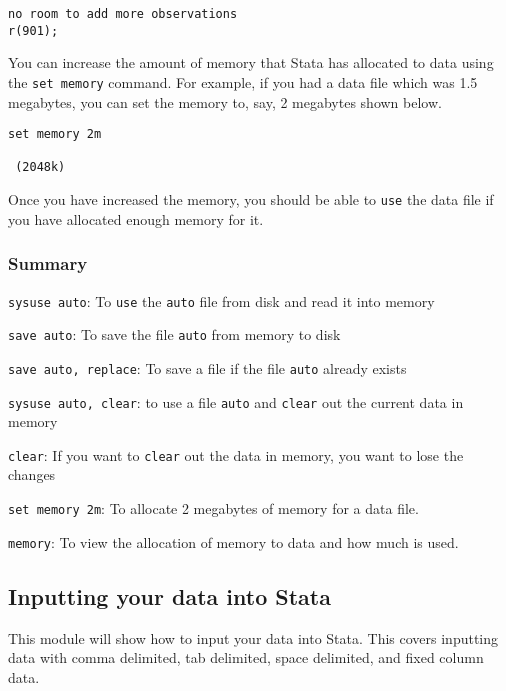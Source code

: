 \begin{lstlisting}
no room to add more observations
r(901);
\end{lstlisting}

You can increase the amount of memory that Stata has allocated to data using the \lstinline{set memory} command. For example, if you had a data file which was 1.5 megabytes, you can set the memory to, say, 2 megabytes shown below.

\begin{lstlisting}
set memory 2m

 (2048k)
\end{lstlisting}

Once you have increased the memory, you should be able to \lstinline{use} the data file if you have allocated enough memory for it.

\subsubsection{Summary}
\begin{compactitem}
\item \lstinline{sysuse auto}: To \lstinline{use} the \lstinline{auto} file from disk and read it into memory
\item \lstinline{save auto}: To save the file \lstinline{auto} from memory to disk
\item \lstinline{save auto, replace}: To save a file if the file \lstinline{auto} already exists
\item \lstinline{sysuse auto, clear}: to use a file \lstinline{auto} and \lstinline{clear} out the current data in memory
\item \lstinline{clear}: If you want to \lstinline{clear} out the data in memory, you want to lose the changes
\item \lstinline{set memory 2m}: To allocate 2 megabytes of memory for a data file.
\item \lstinline{memory}: To view the allocation of memory to data and how much is used.
\end{compactitem}


\subsection{Inputting your data into Stata}

This module will show how to input your data into Stata. This covers inputting data with comma delimited, tab delimited, space delimited, and fixed column data.

